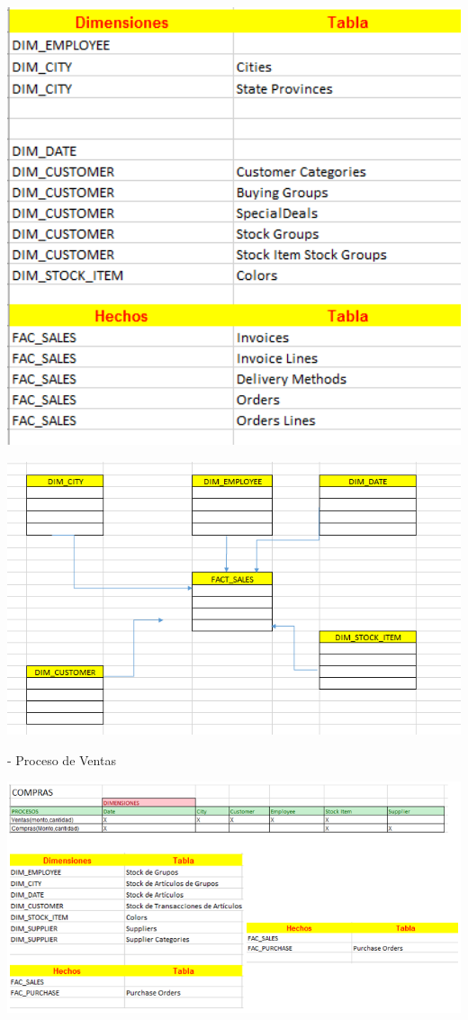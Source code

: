 \documentclass[12pt,letterpaper]{article}
\begin{document}
\begin{center}
\includegraphics[width=15cm]{IMG/4.png} 
\end{center}
\begin{center}
\includegraphics[width=15cm]{IMG/5.png} 
\end{center}

- Proceso de Ventas

\begin{center}
\includegraphics[width=17cm]{IMG/6.png} 
\end{center}
\end{document}
